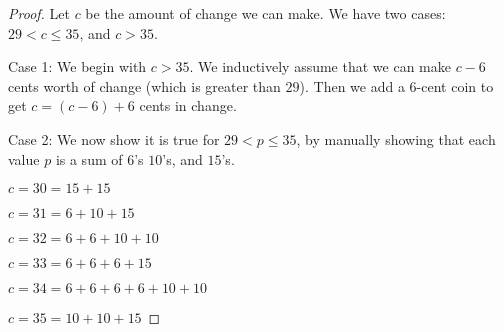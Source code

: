 \documentclass[letterpaper,11pt]{article}
\begin{document}
\begin{enumerate}
\begin{proof}
Let $c$ be the amount of change we can make. We have two cases: $29 < c \leq 35$, and $c > 35$.

Case 1: We begin with $c > 35$.
We inductively assume that we can make $c-6$ cents worth of change (which is greater than $29$). Then we add a $6$-cent coin to get $c = (c-6) + 6$ cents in change.

Case 2: We now show it is true for $29 < p \leq 35$, by manually showing that each value $p$ is a sum of $6$'s $10$'s, and $15$'s. 

$c = 30 = 15 + 15$

$c = 31 = 6 + 10 + 15$

$c = 32 = 6 + 6 + 10 + 10$

$c = 33 = 6 + 6 + 6 + 15$

$c = 34 = 6 + 6 + 6 + 6 + 10 + 10$

$c = 35 = 10 + 10 + 15$

\end{proof}


\end{enumerate}
\end{document}
